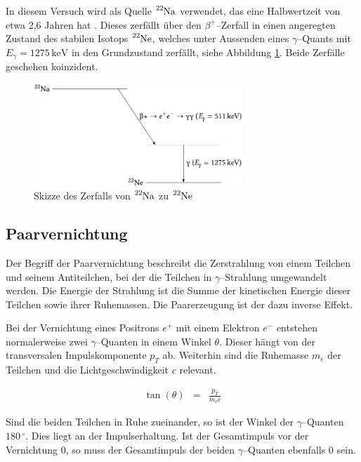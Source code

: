 \documentclass[12pt,a4paper]{scrartcl}
\numberwithin{equation}{section} %
\newcommand{\pu}[1]{\ensuremath{\mathrm{#1}}}
\begin{document}
\noindent
In diesem Versuch wird als Quelle $\ce{^{22}Na}$ verwendet, das eine Halbwertzeit von etwa 2,6 Jahren hat \cite{NuclideChart}. Dieses zerfällt über den $\beta^+$--Zerfall in einen angeregten Zustand des stabilen Isotops $\ce{^{22}Ne}$, welches unter Aussenden eines $\gamma$--Quants mit $E_\gamma = \pu{1275\, keV}$ in den Grundzustand zerfällt, siehe Abbildung \ref{abb:Skizze 22Na}. Beide Zerfälle geschehen koinzident.

\begin{figure}[h]
	\centering
	\includegraphics[width=0.7\textwidth]{../media/B3.4/Zerfall_22_Na.pdf}
	\caption{Skizze des Zerfalls von $\ce{^{22}Na}$ zu $\ce{^{22}Ne}$ \cite{UzK}}
	\label{abb:Skizze 22Na}
\end{figure}

\hypertarget{paarvernichtung}{%
\subsection{Paarvernichtung}\label{paarvernichtung}}

Der Begriff der Paarvernichtung beschreibt die Zerstrahlung von einem Teilchen und seinem Antiteilchen, bei der die Teilchen in $\gamma$--Strahlung umgewandelt werden. Die Energie der Strahlung ist die Summe der kinetischen Energie dieser Teilchen sowie ihrer Ruhemassen. Die Paarerzeugung ist der dazu inverse Effekt. \cite{Paarvernichtung}

Bei der Vernichtung eines Positrons $e^+$ mit einem Elektron $e^-$ entstehen normalerweise zwei $\gamma$--Quanten in einem Winkel $\theta$. Dieser hängt von der transversalen Impulskomponente $p_T$ ab. Weiterhin sind die Ruhemasse $m_e$ der Teilchen und die Lichtgeschwindigkeit $c$ relevant. \cite{Bethge,Annihilation}

\begin{eqnarray}
    \tan(\theta) &=& \frac{p_T}{m_ec}
\end{eqnarray}

\noindent
Sind die beiden Teilchen in Ruhe zueinander, so ist der Winkel der $\gamma$--Quanten $\pu{180\,^\circ}$. Dies liegt an der Impulserhaltung. Ist der Gesamtimpuls vor der Vernichtung $0$, so muss der Gesamtimpuls der beiden $\gamma$--Quanten ebenfalls $0$ sein.
\end{document}
